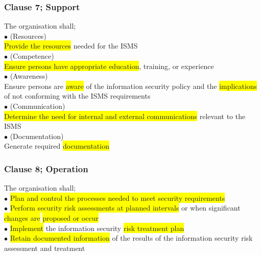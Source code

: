 \documentclass[tikz,border=10pt]{project_plan}
\newcommand{\bulletPoint}{\hspace{-3.1pt}$\bullet$ \hspace{5pt}}
\begin{document}
\subsubsection{Clause 7; Support}
The organisation shall;\\
\bulletPoint (Resources)\\ \colorbox{yellow}{Provide the resources} needed for the ISMS\\
\bulletPoint (Competence)\\ \colorbox{yellow}{Ensure persons have appropriate education}, training, or experience\\
\bulletPoint (Awareness)\\ Ensure persons are \colorbox{yellow}{aware} of the information security policy and the \colorbox{yellow}{implications} of not conforming with the ISMS requirements\\
\bulletPoint (Communication)\\ \colorbox{yellow}{Determine the need for internal and external communications} relevant to the ISMS\\
\bulletPoint (Documentation)\\ Generate required \colorbox{yellow}{documentation}

\newpage

\subsubsection{Clause 8; Operation}
The organisation shall;\\
\bulletPoint \colorbox{yellow}{Plan and control the processes needed to meet security requirements}\\
\bulletPoint \colorbox{yellow}{Perform security risk assessments at planned intervals} or when significant \colorbox{yellow}{changes are} \colorbox{yellow}{proposed or occur}\\
\bulletPoint \colorbox{yellow}{Implement} the information security \colorbox{yellow}{risk treatment plan}\\
\bulletPoint \colorbox{yellow}{Retain documented information} of the results of the information security risk assessment and treatment
\end{document}
